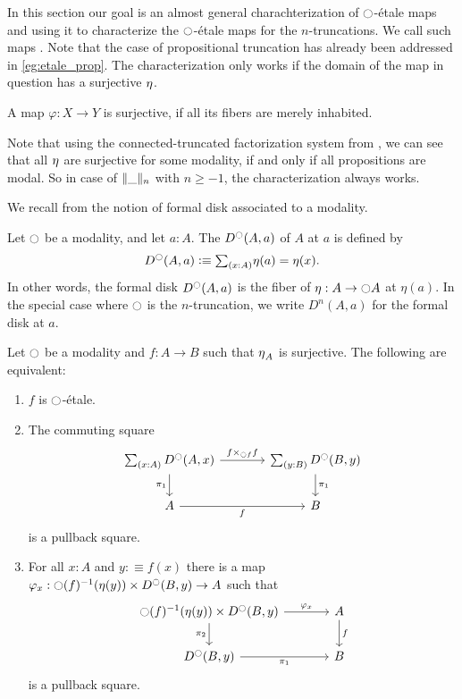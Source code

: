 \documentclass[9pt,twosided]{amsart}
\begin{document}
In this section our goal is an almost general charachterization of ${\ocircle}$-étale maps and using it to characterize the ${\ocircle}$-\'etale maps for the $n$-truncations. We call such maps . Note that the case of propositional truncation has already been addressed in \cref{eg:etale_prop}.
The characterization only works if the domain of the map in question has a surjective ${\eta_{}}$.
\begin{defn}
  A map $\varphi:X\to Y$ is surjective, if all its fibers are merely inhabited.
\end{defn}
Note that using the connected-truncated factorization system from \cite{RijkeSpittersShulman}, we can see that all ${\eta_{}}$ are surjective for some modality, if and only if all propositions are modal.
So in case of $\trunc{n}{\_}$ with $n\geq -1$, the characterization always works.

We recall from \cite{wellen-thesis} the notion of formal disk associated to a modality.

\begin{defn}
  Let ${\ocircle}$ be a modality, and let $a:A$. The  $D^{{\ocircle}}(A,a)$ of $A$ at $a$ is defined by
  \begin{equation*}
    D^\modal(A,a)\defeq \sm{x:A}\eta(a)=\eta(x).
  \end{equation*}
  In other words, the formal disk $D^{\ocircle}(A,a)$ is the fiber of $\eta:A\to{\ensuremath{\ocircle}} A$ at $\eta(a)$. In the special case where ${\ocircle}$ is the $n$-truncation, we write $D^n(A,a)$ for the formal disk at $a$. 
\end{defn}

\begin{lem}\label{lem:etale_char}
Let ${\ocircle}$ be a modality and $f:A\to B$ such that ${\eta_{}}_A$ is surjective. The following are equivalent:
\begin{enumerate}
\item $f$ is ${\ocircle}$-\'etale.
\item The commuting square
\begin{equation*}
\begin{tikzcd}[column sep=large]
\sm{x:A}D^\modal(A,x) \arrow[d,swap,"\pi_1"] \arrow[r,"{f\times_{\modal f} f}"] & \sm{y:B}D^\modal(B,y) \arrow[d,"\pi_1"] \\
A \arrow[r,swap,"f"] & B
\end{tikzcd}
\end{equation*}
is a pullback square.
\item For all $x:A$ and $y:\equiv f(x)$ there is a map $\varphi_x:{\ocircle}(f)^{-1}(\eta(y))\times D^{\ocircle}(B,y)\to A$ such that
  \begin{equation*}
    \begin{tikzcd}[column sep=large]
      \modal(f)^{-1}(\eta(y))\arrow[r,"\varphi_x"]\arrow[d,swap,"\pi_2"]\times D^\modal(B,y)   &  A\arrow[d,"f"] \\
      D^\modal(B,y)\arrow[r,"\pi_1",swap]  & B
    \end{tikzcd}
  \end{equation*}
is a pullback square.
\end{enumerate}
\end{lem}
\end{document}
